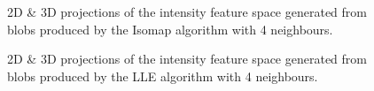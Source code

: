 \begin{figure}[H]
	\centering
	\caption{2D \& 3D projections of the intensity feature space generated from blobs produced by the Isomap algorithm with 4 neighbours.}\label{fig:intensity_iso_mapping}
\end{figure}

\begin{figure}[H]
	\centering
	\caption{2D \& 3D projections of the intensity feature space generated from blobs produced by the LLE algorithm with 4 neighbours.}\label{fig:intensity_LLE_mapping}
\end{figure}
\clearpage

